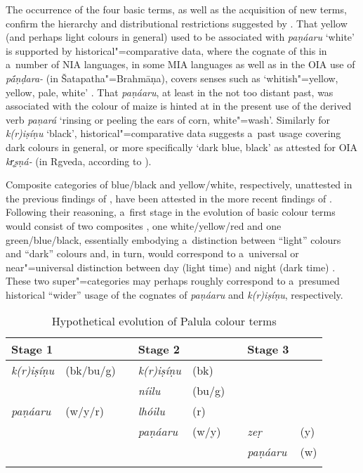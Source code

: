 The occurrence of the four basic terms, as well as the acquisition of new terms, confirm the hierarchy and distributional restrictions suggested by \citet[2--5]{berlinkay1969}. That yellow (and perhaps light colours in general) used to be associated with \textit{paṇáaru} `white' is supported by historical"=comparative data, where the cognate of this in a~number of NIA languages, in some MIA languages as well as in the OIA use of \textit{p\'{\={a}}ṇḍara-} (in Šatapatha"=Brahmāṇa), covers senses such as `whitish"=yellow, yellow, pale, white' \citep[8047]{turner1966}. That \textit{paṇáaru}, at least in the not too distant past, was associated with the colour of maize is hinted at in the present use of the derived verb \textit{paṇará} `rinsing or peeling the ears of corn, white"=wash'. Similarly for \textit{k(r)iṣíṇu} `black', historical"=comparative data suggests a~past usage covering dark colours in general, or more specifically `dark blue, black' as attested for OIA \textit{kr̥ṣṇá-} (in Rgveda, according to \citealt[3451]{turner1966}). 



Composite categories of blue/black and yellow/white, respectively, unattested in the previous findings of \citet{berlinkay1969}, have been attested in the more recent findings of \citet[17]{kayetal1991}. Following their reasoning, a~first stage in the evolution of basic colour terms would consist of two composites \citep[19]{kayetal1991}, one white/yellow/red and one green/blue/black, essentially embodying a~distinction between ``light'' colours and ``dark'' colours and, in turn, would correspond to a~universal or near"=universal distinction between day (light time) and night (dark time) \citep[288]{wierzbicka1996}. These two super"=categories may perhaps roughly correspond to a~presumed historical ``wider'' usage of the cognates of \textit{paṇáaru} and \textit{k(r)iṣíṇu}, respectively. 



\begin{table}[ht]
\caption{Hypothetical evolution of Palula colour terms}
\begin{tabularx}{\textwidth}{ Q Q l Q Q l Q Q }
\lsptoprule
Stage 1 &
&
&
Stage 2 &
&
&
Stage 3 &
\\\hline
\textit{k(r)iṣíṇu} &
(bk/bu/g) &
 &
\textit{k(r)iṣíṇu} &
(bk) &
&
&
\\
&
&
 &
\textit{níilu} &
(bu/g) &
&
&
\\
\textit{paṇáaru} &
(w/y/r) &
&
\textit{lhóilu} &
(r) &
&
&
\\
&
&
&
\textit{paṇáaru} &
(w/y) &
&
\textit{zeṛ} &
(y)\\
&
&
&
&
&
&
\textit{paṇáaru} &
(w)\\\lspbottomrule
\end{tabularx}
\label{tab:6-1}
\end{table}


